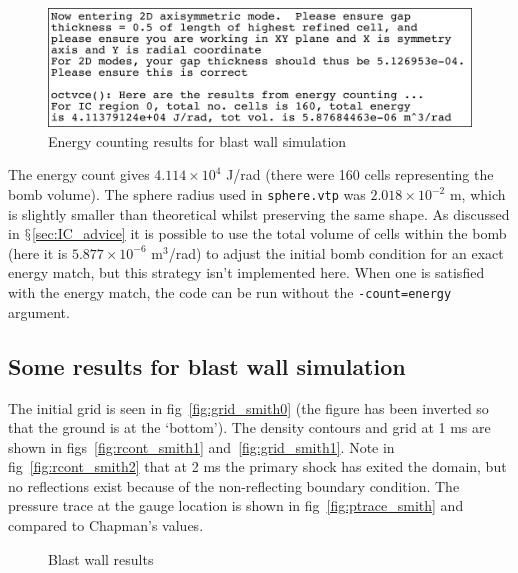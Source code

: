 \documentclass[pdftex, 12pt, a4paper]{report}
\begin{document}
\begin{figure}[htp]
\centering
\includegraphics[width=13cm]{pics/barrier_output.jpg}
\caption{Energy counting results for blast wall simulation}
\label{fig:smith_counte}
\end{figure}

The energy count gives $4.114 \times 10^4$ J/rad (there were 160 cells representing the bomb volume).  The sphere radius used 
in \verb'sphere.vtp' was $2.018 \times 10^{-2}$ m, which is slightly smaller than theoretical whilst preserving the same shape.
As discussed in $\mathsection$\ref{sec:IC_advice} it is possible to use the total volume of cells within the bomb (here it is
$5.877 \times 10^{-6}$ m$^\text{3}$/rad) to adjust the initial bomb condition for an exact energy match, but this strategy isn't implemented here.
When one is satisfied with the energy match, the code can be run without the \verb'-count=energy' argument. 

\subsection{Some results for blast wall simulation}\label{sec:smith_results}

The initial grid is seen in fig~\ref{fig:grid_smith0} (the figure has been inverted so that the ground is at the `bottom').
The density contours and grid at 1 ms are shown in figs~\ref{fig:rcont_smith1} and~\ref{fig:grid_smith1}.  Note in
fig~\ref{fig:rcont_smith2} that at 2 ms the primary shock has exited the domain, but no reflections exist because of the non-reflecting boundary condition.  The
pressure trace at the gauge location is shown in fig~\ref{fig:ptrace_smith} and compared to Chapman's values.

\begin{figure}[htp]
  	\centering
	\caption{Blast wall results}
	\label{fig:smith_wall_results}
\end{figure}
\end{document}
